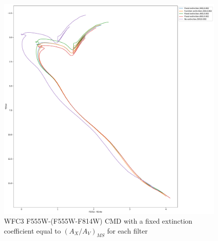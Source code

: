 \documentclass[12pt, a4paper]{report}
\begin{document}
\begin{figure}[h]
\begin{center}
\includegraphics[scale=0.3]{../basti_isochrones_10_13Gyr/Extinction_T5k_FeH0fix_func_f555w_f555wmf814w_500_400_600_Myr_FeH_0p002_ref_noext_Av_1p0.pdf}
\caption{WFC3 F555W-(F555W-F814W) CMD with a fixed extinction coefficient equal to $(A_{X}/A_{V})_{MS}$ for each filter}
\label{wfc3_isoc1_T5k}
\end{center}
\end{figure}
\end{document}

